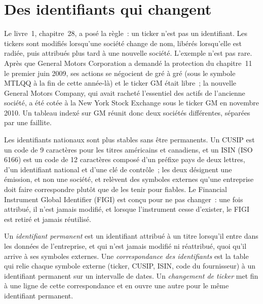 \section{Des identifiants qui changent}

Le livre~1, chapitre~28, a posé la règle~: un ticker n'est pas un identifiant. Les tickers sont modifiés lorsqu'une société
change de nom, libérés lorsqu'elle est radiée, puis attribués plus tard à une nouvelle société. L'exemple n'est pas rare. Après que General Motors Corporation
a demandé la protection du chapitre~11 le premier juin 2009, ses actions se négocient de gré à gré (sous le symbole MTLQQ à la fin de cette année-là) et le ticker GM
était libre~; la nouvelle General Motors Company, qui avait racheté l'essentiel des actifs de l'ancienne société, a été cotée à la New York Stock
Exchange sous le ticker GM en novembre 2010. Un tableau indexé sur GM réunit donc deux sociétés différentes, séparées par une faillite.

Les identifiants nationaux sont plus stables sans être permanents. Un CUSIP est un code de 9 caractères pour les titres américains et canadiens, et un
ISIN (ISO 6166) est un code de 12 caractères composé d'un préfixe pays de deux lettres, d'un identifiant national et d'une clé de contrôle~; les deux
désignent une émission, et non une société, et relèvent des symboles externes qu'une entreprise doit faire correspondre plutôt que de les tenir pour fiables. Le Financial Instrument Global Identifier
(FIGI) est conçu pour ne pas changer~: une fois attribué, il n'est jamais modifié, et lorsque l'instrument cesse d'exister, le FIGI est
retiré et jamais réutilisé.

\begin{definition}\label{def:rs:universe-symbology-and-corporate-actions:permanent}
Un \emph{identifiant permanent} est un identifiant attribué à un titre lorsqu'il entre dans les données de
l'entreprise, et qui n'est jamais modifié ni réattribué, quoi qu'il arrive à ses symboles externes. Une \emph{correspondance des identifiants}
est la table qui relie chaque symbole externe (ticker, CUSIP, ISIN, code du fournisseur) à un identifiant permanent sur un intervalle de dates.
Un \emph{changement de ticker} met fin à une ligne de cette correspondance et en ouvre une autre pour le même identifiant permanent.
\end{definition}

